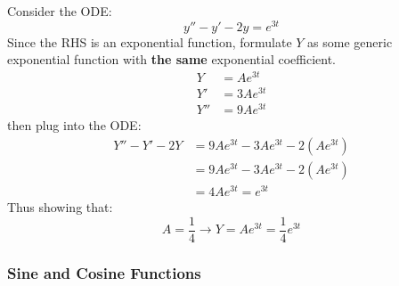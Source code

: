 \documentclass[12pt]{article}
\begin{document}
Consider the ODE:
\begin{equation*}
  y'' - y' - 2y = e^{3t}
\end{equation*}
Since the RHS is an exponential function, formulate $Y$ as some generic exponential function with \textbf{the same} exponential coefficient.
\begin{align*}
  Y   &= Ae^{3t} \\
  Y'  &= 3Ae^{3t} \\
  Y'' &= 9Ae^{3t}
\end{align*}
then plug into the ODE:
\begin{align*}
  Y'' - Y' - 2Y &= 9Ae^{3t} - 3Ae^{3t} - 2\left(Ae^{3t}\right) \\
                &= 9Ae^{3t} - 3Ae^{3t} - 2\left(Ae^{3t}\right) \\
                &= 4Ae^{3t} = e^{3t}
\end{align*}
Thus showing that:
\begin{equation*}
  A = \frac{1}{4} \rightarrow Y = Ae^{3t} = \frac{1}{4}e^{3t}
\end{equation*}

\subsubsection{Sine and Cosine Functions}
\label{sssec:sinAndCosFunctions}
\end{document}
